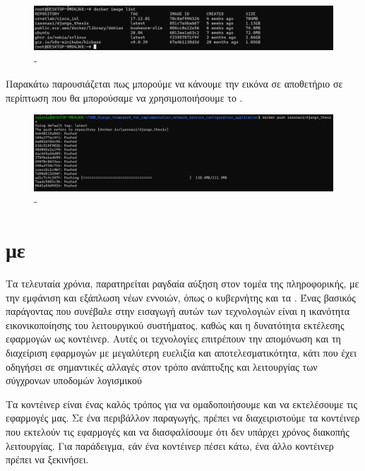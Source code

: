\begin{figure}[h]
	\centering
	\includegraphics[width=1.5\textwidth]{graphics/docker_image_list_2.png}
	\caption{-}
\end{figure}

\FloatBarrier



\noindent Παρακάτω παρουσιάζεται πως μπορούμε να κάνουμε  την εικόνα
σε αποθετήριο σε περίπτωση που θα μπορούσαμε να χρησιμοποιήσουμε το 
.

\FloatBarrier

\begin{figure}[h]
	\centering
	\includegraphics[width=1.5\textwidth]{graphics/dockerpush.png}
	\caption{-}
\end{figure}

\FloatBarrier

\section{ με }

Τα τελευταία χρόνια, παρατηρείται ραγδαία αύξηση στον τομέα της πληροφορικής, 
με την εμφάνιση και εξάπλωση νέων εννοιών, όπως ο κυβερνήτης και τα . 
Ένας βασικός παράγοντας που συνέβαλε στην εισαγωγή αυτών των τεχνολογιών είναι η ικανότητα εικονικοποίησης 
του λειτουργικού συστήματος, καθώς και η δυνατότητα εκτέλεσης εφαρμογών ως κοντέινερ. 
Αυτές οι τεχνολογίες επιτρέπουν την απομόνωση και τη διαχείριση εφαρμογών με μεγαλύτερη ευελιξία και 
αποτελεσματικότητα, κάτι που έχει οδηγήσει σε σημαντικές αλλαγές στον τρόπο ανάπτυξης και λειτουργίας των σύγχρονων υποδομών λογισμικού

Τα κοντέινερ είναι ένας καλός τρόπος για να ομαδοποιήσουμε και να εκτελέσουμε τις εφαρμογές μας. 
Σε ένα περιβάλλον παραγωγής, πρέπει να διαχειριστούμε τα κοντέινερ που εκτελούν τις εφαρμογές και να 
διασφαλίσουμε ότι δεν υπάρχει χρόνος διακοπής λειτουργίας. Για παράδειγμα, εάν ένα κοντέινερ πέσει κάτω, ένα άλλο κοντέινερ πρέπει να ξεκινήσει. 

